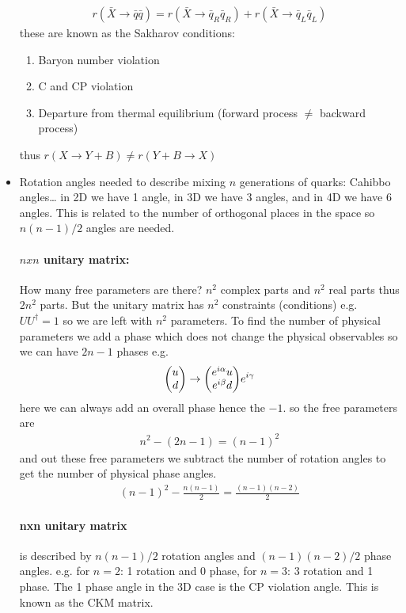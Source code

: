 \documentclass[../main.tex]{subfiles}
\begin{document}
\begin{itemize}
\begin{align*}
        r(\bar X \to \bar q \bar q) = r(\bar X \to \bar q_R \bar q_R) + r(\bar X \to \bar q_L \bar q_L)
    \end{align*}
    these are known as the Sakharov conditions:
    \begin{enumerate}
        \item Baryon number violation
        \item C and CP violation
        \item Departure from thermal equilibrium (forward process $\neq$ backward process)
    \end{enumerate}
    thus $r(X \to Y + B) \neq r(Y + B \to X)$
    \item Rotation angles needed to describe mixing $n$ generations of quarks: Cahibbo angles\dots
    in 2D we have 1 angle, in 3D we have 3 angles, and in 4D we have 6 angles. This is related to 
    the number of orthogonal places in the space so $n(n-1)/2$ angles are needed.
    \paragraph*{$n x n$ unitary matrix:} How many free parameters are there? $n^2$ complex
    parts and $n^2$ real parts thus $2n^2$ parts. But the unitary matrix has $n^2$ constraints
    (conditions) e.g. $U U^\dagger = 1$ so we are left with $n^2$ parameters. To find the number of
    physical parameters we add a phase which does not change the physical observables so we can have
    $2n - 1$ phases e.g.
    \begin{align*}
        \mqty(u \\ d) \to \mqty(e^{i\alpha} u \\ e^{i\beta} d) e^{i\gamma}
    \end{align*}
    here we can always add an overall phase hence the $-1$. so the free parameters are
    \begin{align*}
        n^2 - (2n - 1) = (n-1)^2
    \end{align*}
    and out these free parameters we subtract the number of rotation angles to get the number of
    physical phase angles.
    \begin{align*}
        (n - 1)^2 - \frac{n(n - 1)}{2} = \frac{(n - 1)(n - 2)}{2}
    \end{align*}
    \paragraph*{nxn unitary matrix} is described by $n(n-1)/2$ rotation angles and $(n-1)(n-2)/2$
    phase angles. e.g. for $n = 2$: 1 rotation and 0 phase, for $n = 3$: 3 rotation and 1 phase. The
    1 phase angle in the 3D case is the CP violation angle. This is known as the CKM matrix.

\end{itemize}
\end{document}
